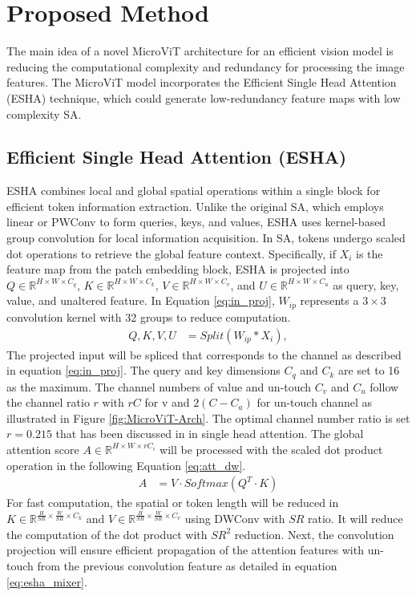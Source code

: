 \section{Proposed Method}
The main idea of a novel MicroViT architecture for an efficient vision model is reducing the computational complexity and redundancy for processing the image features. The MicroViT model incorporates the Efficient Single Head Attention (ESHA) technique, which could generate low-redundancy feature maps with low complexity SA.

\subsection{Efficient Single Head Attention (ESHA)} 
ESHA combines local and global spatial operations within a single block for efficient token information extraction. Unlike the original SA, which employs linear or PWConv to form queries, keys, and values, ESHA uses kernel-based group convolution for local information acquisition. In SA, tokens undergo scaled dot operations to retrieve the global feature context. Specifically, if $X_i$ is the feature map from the patch embedding block, ESHA is projected into $Q\in \mathbb{R}^{H\times W\times C_{q}}$, $K\in \mathbb{R}^{H\times W\times C_{k}}$, $V\in \mathbb{R}^{H\times W\times C_{v}}$, and $U\in \mathbb{R}^{H\times W\times C_{u}}$ as query, key, value, and unaltered feature. In Equation \ref{eq:in_proj}, $W_{ip}$ represents a $3 \times 3$ convolution kernel with 32 groups to reduce computation.
\begin{align}
    Q, K, V, U &= Split(W_{ip}*X_i), 
    \label{eq:in_proj}
\end{align} 
The projected input will be spliced that corresponds to the channel as described in equation \ref{eq:in_proj}. The query and key dimensions $C_q$ and $C_k$ are set to 16 as the maximum. The channel numbers of value and un-touch $C_v$ and $C_u$ follow the channel ratio $r$ with $rC$ for v and $2(C-C_a)$ for un-touch channel as illustrated in Figure \ref{fig:MicroViT-Arch}. The optimal channel number ratio is set $r=0.215$ that has been discussed in \cite{yun2024shvit} in single head attention.
The global attention score $A\in \mathbb{R}^{H\times W\times rC_{i}}$ will be processed with the scaled dot product operation in the following Equation \ref{eq:att_dw}.
\begin{align}
    A &= V\cdot Softmax(Q^T\cdot K) 
    \label{eq:att_dw}
\end{align} 
For fast computation, the spatial or token length will be reduced in $K\in \mathbb{R}^{\frac{H}{SR}\times \frac{W}{SR}\times C_{k}}$ and $V\in \mathbb{R}^{\frac{H}{SR}\times \frac{W}{SR}\times C_{v}}$ using DWConv with $SR$ ratio. It will reduce the computation of the dot product with $SR^2$ reduction. Next, the convolution projection will ensure efficient propagation of the attention features with un-touch from the previous convolution feature as detailed in equation \ref{eq:esha_mixer}.
